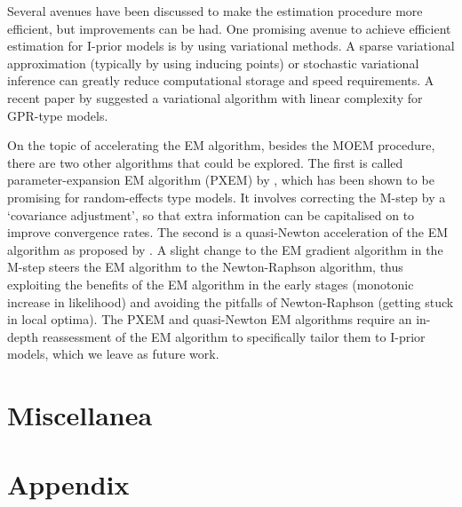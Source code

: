 \documentclass[a4paper,showframe,11pt]{report}
\begin{document}
Several avenues have been discussed to make the estimation procedure more efficient, but improvements can be had.
One promising avenue to achieve efficient estimation for I-prior models is by using variational methods.
A sparse variational approximation (typically by using inducing points) or stochastic variational inference can greatly reduce computational storage and speed requirements.
A recent paper by \citet{cheng2017variational} suggested a variational algorithm with linear complexity for GPR-type models.

On the topic of accelerating the EM algorithm, besides the MOEM procedure, there are two other algorithms that could be explored.
The first is called parameter-expansion EM algorithm (PXEM) by \citep{liu1998parameter}, which has been shown to be promising for random-effects type models.
It involves correcting the M-step by a `covariance adjustment', so that extra information can be capitalised on to improve convergence rates.
The second is a quasi-Newton acceleration of the EM algorithm as proposed by \citet{lange1995quasi}.
A slight change to the EM gradient algorithm in the M-step steers the EM algorithm to the Newton-Raphson algorithm, thus exploiting the benefits of the EM algorithm in the early stages (monotonic increase in likelihood) and avoiding the pitfalls of Newton-Raphson (getting stuck in local optima).
The PXEM and quasi-Newton EM algorithms require an in-depth reassessment of the EM algorithm to specifically tailor them to I-prior models, which we leave as future work.

\section{Miscellanea}


\ifstandalone
  \section*{Appendix}
  
  
  
  
\fi

\hClosingStuffStandalone
\end{document}
